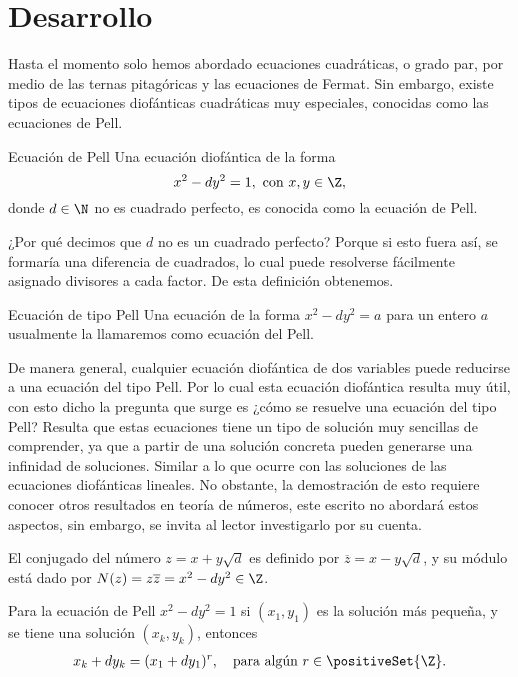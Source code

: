 \section{Desarrollo}
Hasta el momento solo hemos abordado ecuaciones cuadráticas, o grado par, por medio de las ternas pitagóricas y
las ecuaciones de Fermat.
Sin embargo, existe tipos de ecuaciones diofánticas cuadráticas muy especiales, conocidas como las ecuaciones de Pell.

\begin{definition.box}{Ecuación de Pell}{}
    Una ecuación diofántica de la forma
    \[
        x^2 - dy^2 = 1, \ \text{con} \ x,y \in \Z,
    \]
    donde $d \in \N$ no es cuadrado perfecto, es conocida como la ecuación de Pell.
\end{definition.box}

¿Por qué decimos que $d$ no es un cuadrado perfecto?
Porque si esto fuera así, se formaría una diferencia de cuadrados, lo cual puede resolverse fácilmente asignado divisores a cada factor.
De esta definición obtenemos.

\begin{definition.box}{Ecuación de tipo Pell}{}
    Una ecuación de la forma $x^2 - dy^2 = a$ para un entero $a$ usualmente la llamaremos como ecuación del Pell.
\end{definition.box}

De manera general, cualquier ecuación diofántica de dos variables puede reducirse a una ecuación del tipo Pell.
Por lo cual esta ecuación diofántica resulta muy útil, con esto dicho la pregunta que surge es ¿cómo se resuelve una ecuación del tipo Pell?
Resulta que estas ecuaciones tiene un tipo de solución muy sencillas de comprender, ya que a partir de una solución concreta pueden generarse una infinidad de soluciones.
Similar a lo que ocurre con las soluciones de las ecuaciones diofánticas lineales.
No obstante, la demostración de esto requiere conocer otros resultados en teoría de números, este escrito no abordará estos aspectos, sin embargo, se invita al lector investigarlo por su cuenta.

\begin{definition.box}{}{}
    El conjugado del número $z = x + y\sqrt{d}$ es definido por $\overline{z} = x - y \sqrt{d}$, y su módulo está dado por $N(z) = z \overline{z} = x^2 - dy^2 \in \Z$.
\end{definition.box}

\begin{theorem.box}{}{}
    Para la ecuación de Pell $x^2 - dy^2 = 1$ si $(x_1, y_1)$ es la solución más pequeña, y se tiene una solución $(x_k, y_k)$, entonces
    \begin{align*}
        x_k + d y_k = (x_1 + dy_1)^r, \quad \text{para algún}\ r\in \positiveSet{\Z}.
    \end{align*}
\end{theorem.box}


